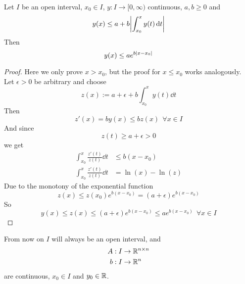 \documentclass[../../script.tex]{subfiles}
\begin{document}
\begin{lem}
    Let $I$ be an open interval, $x_0 \in I$, $y: I \rightarrow [0, \infty)$ continuous, $a, b \ge 0$ and 
    \[
        y(x) \le a + b \abs{\int_{x_0}^x y(t) \dd{t}}
    \]
    Then 
    \[
        y(x) \le a e^{b\abs{x - x_0}}
    \]
\end{lem}
\begin{proof}
    Here we only prove $x > x_0$, but the proof for $x \le x_0$ works analogously.
    Let $\epsilon > 0$ be arbitrary and choose 
    \begin{equation}
        z(x) := a + \epsilon + b \int_{x_0}^x y(t) \dd{t}
    \end{equation}
    Then 
    \begin{equation}
        z'(x) = by(x) \le bz(x) ~~\forall x \in I
    \end{equation}
    And since 
    \begin{equation}
        z(t) \ge a + \epsilon > 0
    \end{equation}
    we get 
    \begin{align}
        \int_{x_0}^x \frac{z'(t)}{z(t)} \dd{t} &\le b(x - x_0) \\
        \int_{x_0}^x \frac{z'(t)}{z(t)} \dd{t} &= \ln(x) - \ln(z)
    \end{align}
    Due to the monotony of the exponential function 
    \begin{equation}
        z(x) \le z(x_0) e^{b(x - x_0)} = (a + \epsilon) e^{b(x - x_0)}
    \end{equation}
    So 
    \begin{equation}
        y(x) \le z(x) \le (a + \epsilon) e^{b(x - x_0)} \le a e^{b(x - x_0)} ~~\forall x \in I
    \end{equation}
\end{proof}

From now on $I$ will always be an open interval, and 
\begin{align*}
    A: I &\rightarrow \mathbb{R}^{n \times n} \\
    b: I &\rightarrow \mathbb{R}^n
\end{align*}
are continuous, $x_0 \in I$ and $y_0 \in \mathbb{R}$.
\end{document}
